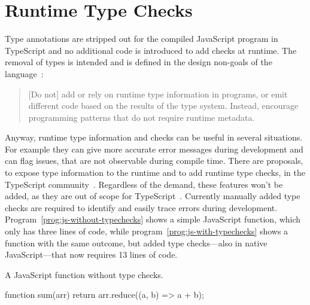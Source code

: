 \section{Runtime Type Checks}
\label{sec:runtime-type-checks}


Type annotations are stripped out for the compiled JavaScript program in TypeScript and no additional code is introduced to add checks at runtime. The removal of types is intended and is defined in the design non-goals of the language~\cite{TypeScriptWiki:DesignGoals}:
\begin{quote}
  [Do not] add or rely on runtime type information in programs,
  or emit different code based on the results of the type system.
  Instead, encourage programming patterns that do not require runtime metadata.
\end{quote}
Anyway, runtime type information and checks can be useful in several situations. 
For example they can give more accurate error messages during development and can 
flag issues, that are not observable during compile time.
There are proposals, to expose type information to the runtime and to add runtime type
checks, in the TypeScript community~\cites{TypeScriptIssue:RuntimeTypeChecking, TypeScriptIssue:RuntimeTypeChecks, TypeScriptIssue:EmitTypeArguments}. Regardless of the demand, these features won't be added, as they are out of scope
for TypeScript~\cite{TypeScriptIssue:RuntimeTypeChecking:Comment:OutOfScope, TypeScriptIssue:EmitTypeArguments:Comment:OutOfScope}.
Currently manually added type checks are required to identify and easily trace errors during development. Program~\ref{prog:js-without-typechecks} shows a simple JavaScript function, which only has three lines of code, while program~\ref{prog:js-with-typechecks} shows a function with the same outcome, but added type 
checks---also in native JavaScript---that now requires 13 lines of code.
\begin{program}
\caption{A JavaScript function without type checks.}
\label{prog:js-without-typechecks}
\begin{JsCode}
function sum(arr) {
  return arr.reduce((a, b) =>  a + b);
}
\end{JsCode}
\end{program}
